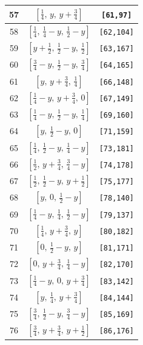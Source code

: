 \documentclass[fleqn,8pt]{jsarticle}
\begin{document}
\begin{longtable}{ccc}
57 & $\left[ \frac{1}{4},\, y,\, y + \frac{3}{4} \right]$ & {\tt [61,97]} \\ \hline
58 & $\left[ \frac{1}{4},\, \frac{1}{4} - y,\, \frac{1}{2} - y \right]$ & {\tt [62,104]} \\ \hline
59 & $\left[ y + \frac{1}{2},\, \frac{1}{2} - y,\, \frac{1}{2} \right]$ & {\tt [63,167]} \\ \hline
60 & $\left[ \frac{3}{4} - y,\, \frac{1}{2} - y,\, \frac{3}{4} \right]$ & {\tt [64,165]} \\ \hline
61 & $\left[ y,\, y + \frac{3}{4},\, \frac{1}{4} \right]$ & {\tt [66,148]} \\ \hline
62 & $\left[ \frac{1}{4} - y,\, y + \frac{3}{4},\, 0 \right]$ & {\tt [67,149]} \\ \hline
63 & $\left[ \frac{1}{4} - y,\, \frac{1}{2} - y,\, \frac{1}{4} \right]$ & {\tt [69,160]} \\ \hline
64 & $\left[ y,\, \frac{1}{2} - y,\, 0 \right]$ & {\tt [71,159]} \\ \hline
65 & $\left[ \frac{1}{4},\, \frac{1}{2} - y,\, \frac{1}{4} - y \right]$ & {\tt [73,181]} \\ \hline
66 & $\left[ \frac{1}{2},\, y + \frac{3}{4},\, \frac{3}{4} - y \right]$ & {\tt [74,178]} \\ \hline
67 & $\left[ \frac{1}{2},\, \frac{1}{2} - y,\, y + \frac{1}{2} \right]$ & {\tt [75,177]} \\ \hline
68 & $\left[ y,\, 0,\, \frac{1}{2} - y \right]$ & {\tt [78,140]} \\ \hline
69 & $\left[ \frac{1}{4} - y,\, \frac{1}{4},\, \frac{1}{2} - y \right]$ & {\tt [79,137]} \\ \hline
70 & $\left[ \frac{1}{4},\, y + \frac{3}{4},\, y \right]$ & {\tt [80,182]} \\ \hline
71 & $\left[ 0,\, \frac{1}{2} - y,\, y \right]$ & {\tt [81,171]} \\ \hline
72 & $\left[ 0,\, y + \frac{3}{4},\, \frac{1}{4} - y \right]$ & {\tt [82,170]} \\ \hline
73 & $\left[ \frac{1}{4} - y,\, 0,\, y + \frac{3}{4} \right]$ & {\tt [83,142]} \\ \hline
74 & $\left[ y,\, \frac{1}{4},\, y + \frac{3}{4} \right]$ & {\tt [84,144]} \\ \hline
75 & $\left[ \frac{3}{4},\, \frac{1}{2} - y,\, \frac{3}{4} - y \right]$ & {\tt [85,169]} \\ \hline
76 & $\left[ \frac{3}{4},\, y + \frac{3}{4},\, y + \frac{1}{2} \right]$ & {\tt [86,176]} \\ \hline

\end{longtable}
\end{document}

